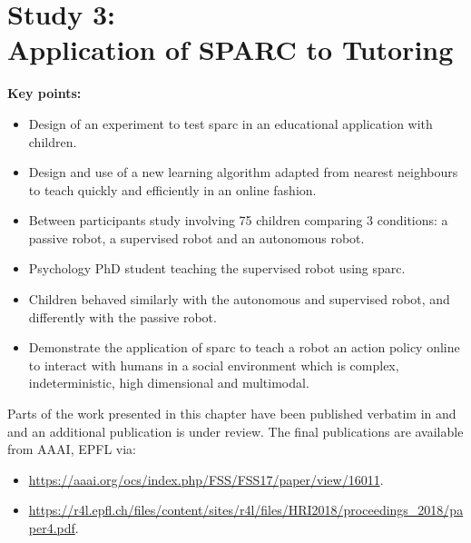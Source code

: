 \chapter[Study 3: Application of SPARC to Tutoring]{Study 3: \\Application of SPARC to Tutoring}\label{chap:tutoring}
\glsresetall
\graphicspath{{images/tutoring/}}

\begin{framed}
	\textbf{Key points:}
	
	\begin{itemize}
		\item Design of an experiment to test \acrshort{sparc} in an educational application with children.
		\item Design and use of a new learning algorithm adapted from nearest neighbours to teach quickly and efficiently in an online fashion.
		\item Between participants study involving 75 children comparing 3 conditions: a passive robot, a supervised robot and an autonomous robot.
		\item Psychology PhD student teaching the supervised robot using \acrshort{sparc}.
		\item Children behaved similarly with the autonomous and supervised robot, and differently with the passive robot.
		\item Demonstrate  the application of \acrshort{sparc} to teach a robot an action policy online to interact with humans in a social environment which is complex, indeterministic, high dimensional and multimodal.
	\end{itemize}
\end{framed}

Parts of the work presented in this chapter have been published verbatim in \cite{senft2017toward} and \cite{senft2018robots} and an additional publication is under review. The final publications are available from AAAI, EPFL via:
\begin{itemize}
	\item \url{https://aaai.org/ocs/index.php/FSS/FSS17/paper/view/16011}.
	\item \url{https://r4l.epfl.ch/files/content/sites/r4l/files/HRI2018/proceedings_2018/paper4.pdf}.
\end{itemize} 


